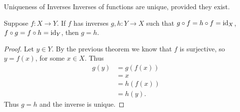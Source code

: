 \documentclass[class=article, crop=false]{standalone}
\begin{document}
  \begin{theorem}{Uniqueness of Inverses}
    Inverses of functions are unique, provided they exist. \par
    Suppose $f\colon X\to Y$. If $f$ has inverses $g,h\colon Y\to X$ such that $g\circ f = h\circ f = \operatorname{id}_X$, $f\circ g = f\circ h = \operatorname{id}_Y$, then $g = h$.
  \end{theorem}
  \begin{proof}
    Let $y\in Y$. By the previous theorem we know that $f$ is surjective, so $y = f(x)$, for some $x\in X$. Thus
    \begin{align*}
      g(y) &= g(f(x)) \\
      &= x \\
      &= h(f(x)) \\
      &= h(y).
    \end{align*}
    Thus $g = h$ and the inverse is unique.
  \end{proof}
\end{document}
